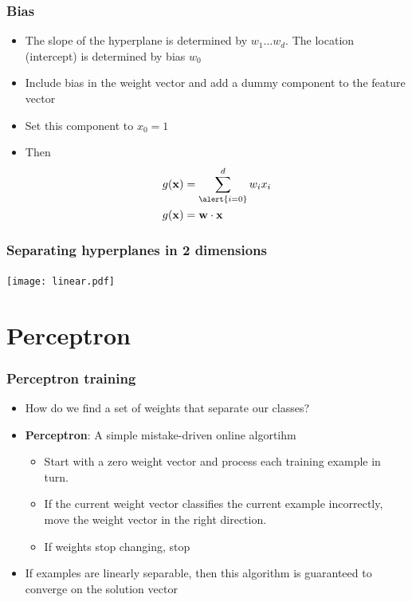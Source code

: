 \documentclass[14pt,mathserif]{beamer}
\newcommand{\x}{\mathbf{x}}
\newcommand{\w}{\mathbf{w}}
\begin{document}
\begin{frame}
 \frametitle{Bias}
\begin{itemize}
\item The slope of the hyperplane is determined by
  $w_1...w_d$. The location (intercept) is determined by  bias $w_0$
\item Include bias in the
  weight vector and add a dummy component to the feature vector
\item Set this component to $x_0 = 1$
\item Then 
 \begin{align}
 g(\x) & = \sum_{\alert{i=0}}^d w_i x_i\\
 g(\x) & = \w \cdot \x
\end{align}
\end{itemize}
\end{frame}

\begin{frame}
\label{hyperplanes}
 \begin{center}\frametitle{Separating hyperplanes in 2 dimensions}
\vskip -0.5cm 
\texttt{[image: linear.pdf]}
\end{center}
\end{frame}



\section{Perceptron}
\begin{frame}
 \frametitle{Perceptron training}
\begin{itemize}
 \item How do we find a set of weights that separate our classes?
\item \textbf{Perceptron}: A simple mistake-driven online algortihm
\begin{block}{}
\begin{itemize}
\item  Start with a zero weight vector and process each training example in turn. 
\item If the current weight vector classifies the current example incorrectly, move the weight vector in the right direction. 
\item If weights stop changing, stop
\end{itemize}
\end{block}
 \item If examples are linearly separable, then this algorithm is guaranteed to converge on the solution vector
\end{itemize}
\end{frame}
\end{document}
